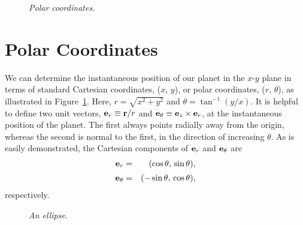 \begin{figure}
\epsfysize=2.25in
\centerline{}
\caption{\em Polar coordinates.}\label{polar}
\end{figure}

\section{Polar Coordinates}\label{s6.5}
We can determine the instantaneous position of our planet in the
$x$-$y$ plane in terms of standard Cartesian coordinates, ($x$, $y$),
or polar coordinates, ($r$, $\theta$), as illustrated in Figure~\ref{polar}. Here, $r=\sqrt{x^2+y^2}$ and $\theta=\tan^{-1}(y/x)$. 
It is helpful to define  two unit vectors, ${\bf e}_r\equiv {\bf r}/r$ and
${\bf e}_\theta\equiv {\bf e}_z\times {\bf e}_r$, at the
instantaneous position of the planet. The first always points radially away from the origin,
whereas the second is normal to the first, in the direction of increasing $\theta$. As is easily demonstrated, the Cartesian components of
${\bf e}_r$ and ${\bf e}_\theta$ are
\begin{eqnarray}\label{e6.9}
{\bf e}_r &=& (\cos\theta,\, \sin\theta),\\[0.5ex]
{\bf e}_\theta &=& (-\sin\theta,\, \cos\theta),\label{e6.10}
\end{eqnarray}
respectively. 

\begin{figure}
\epsfysize=2.25in
\centerline{}
\caption{\em An ellipse.}\label{ellipse}
\end{figure}


